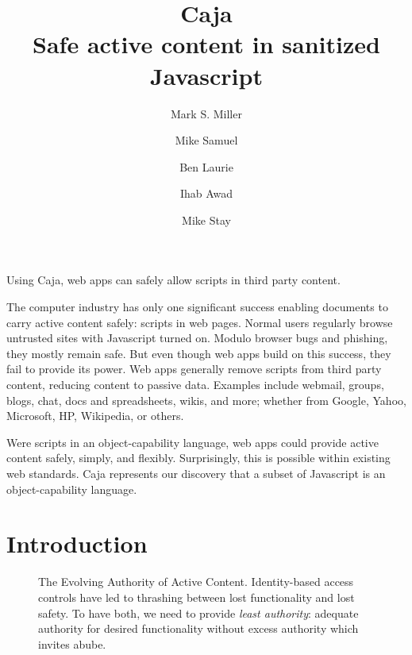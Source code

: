 \documentclass[letterpaper,twocolumn,10pt]{article}
\title{Caja\\
Safe active content in sanitized Javascript}
\author{
        {\rm Mark S. Miller}
        \and 
        {\rm Mike Samuel}
        \and 
        {\rm Ben Laurie}
        \and 
        {\rm Ihab Awad}
        \and 
        {\rm Mike Stay}}
\begin{document}
\maketitle


\abstract

Using Caja, web apps can safely allow scripts in third party content.

The computer industry has only one significant success enabling documents to 
carry active content safely: scripts in web pages. Normal users regularly 
browse untrusted sites with Javascript turned on. Modulo browser bugs and 
phishing, they mostly remain safe. But even though web apps build on this 
success, they fail to provide its power. Web apps generally remove scripts 
from third party content, reducing content to passive data. Examples include 
webmail, groups, blogs, chat, docs and spreadsheets, wikis, and more; whether 
from Google, Yahoo, Microsoft, HP, Wikipedia, or others.

Were scripts in an object-capability language, web apps could provide active 
content safely, simply, and flexibly. Surprisingly, this is possible within 
existing web standards. Caja represents our discovery that a subset of 
Javascript is an object-capability language.

\section{Introduction}

\begin{figure}[t!]
  
\caption[The Evolving Authority of Active Content]{The Evolving Authority of 
Active Content. Identity-based access controls have led to thrashing between 
lost functionality and lost safety. To have both, we need to provide 
\emph{least authority}: adequate authority for desired functionality without 
excess authority which invites abube.}
  \label{fig:evo-auth}
\end{figure}
\end{document}
